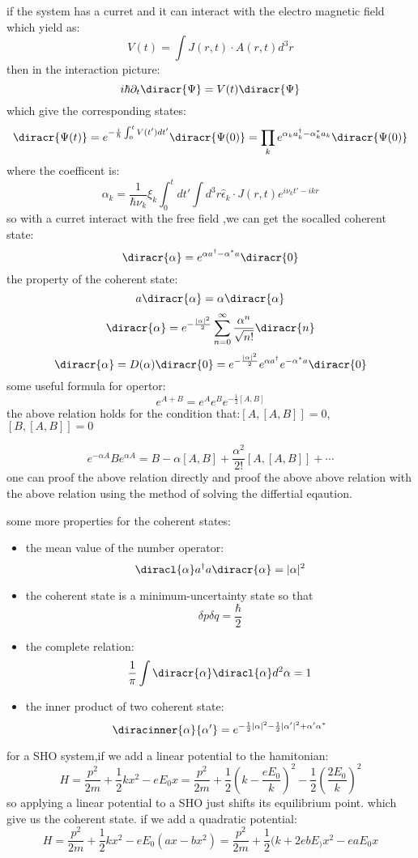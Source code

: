 if the system has a curret and it can interact with the electro magnetic field which yield as:
\[V(t)=\int J(r,t)\cdot A(r,t)d^3r\]
then in the interaction picture:
\[i\hbar\partial_t \diracr{\Psi}=V(t)\diracr{\Psi}\]
which give the corresponding states:
\[\diracr{\Psi(t)}=e^{-\frac{i}{\hbar}\int_0^t V(t')dt'}\diracr{\Psi(0)}=\prod_ke^{\alpha_ka_k^\dagger-\alpha_k^*a_k}\diracr{\Psi(0)}\]
where the coefficent is:
\[\alpha_k=\frac{1}{\hbar\nu_k}\xi_k\int_0^tdt'\int d^3r\hat{\epsilon}_k\cdot J(r,t)e^{i\nu_k t'-ikr}\]
 so with a curret interact with the free field ,we can get the socalled coherent state:
 \[\diracr{\alpha}=e^{\alpha a^\dagger-\alpha^*a}\diracr{0}\]
 the property of the coherent state:
 \[a\diracr{\alpha}=\alpha\diracr{\alpha}\]
 \[\diracr{\alpha}=e^{-\frac{|\alpha|^2}{2}}\sum_{n=0}^\infty\frac{\alpha^n}{\sqrt{n!}}\diracr{n}\]
 \[\diracr{\alpha}=D(\alpha)\diracr{0}=e^{-\frac{|\alpha|^2}{2}}e^{\alpha a^\dagger}e^{-\alpha^* a}\diracr{0}\]
 some useful formula for opertor:
 \[e^{A+B}=e^Ae^Be^{-\frac{1}{2}[A,B]}\]
 the above relation holds for the condition that:$[A,[A,B]]=0$,$[B,[A,B]]=0$\par
 \[e^{-\alpha A }Be^{\alpha A}=B-\alpha[A,B]+\frac{\alpha^2}{2!}[A,[A,B]]+\cdots\]
 one can proof the above relation directly and proof the above above relation with the above relation using the method of solving the differtial eqaution.\par
 some more properties for the coherent states:
 \begin{itemize}
 \item{the mean value of the number operator:\[\diracl{\alpha} a^\dagger a\diracr{\alpha}=|\alpha|^2\]}
 \item{the coherent state is a minimum-uncertainty state so that\[\delta p\delta q=\frac{\hbar}{2}\]}
 \item{the complete relation:\[\frac{1}{\pi}\int \diracr{\alpha}\diracl{\alpha}d^2\alpha=1\]}
 \item{the inner product of two coherent state:\[\diracinner{\alpha}{\alpha'}=e^{-\frac{1}{2}|\alpha|^2-\frac{1}{2}|\alpha'|^2+\alpha'\alpha^*}\]}
 \end{itemize}
for a SHO system,if we add a linear potential to the hamitonian:
\[H=\frac{p^2}{2m}+\frac{1}{2}kx^2-eE_0x=\frac{p^2}{2m}+\frac{1}{2}(k-\frac{eE_0}{k})^2-\frac{1}{2}(\frac{2E_0}{k})^2\]
so applying a linear potential to a SHO just shifts its equilibrium point. which give us the coherent state.
if we add a quadratic potential:
\[H=\frac{p^2}{2m}+\frac{1}{2}kx^2-eE_0(ax-bx^2)=\frac{p^2}{2m}+\frac{1}{2}(k+2ebE_)x^2-eaE_0x\]

